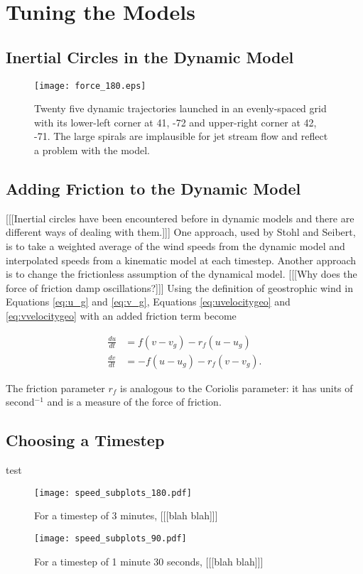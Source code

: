 \chapter{Tuning the Models}

\section{Inertial Circles in the Dynamic Model}

\begin{figure}
    \texttt{[image: force\_180.eps]}
    \centering
    \caption{Twenty five dynamic trajectories launched in an evenly-spaced grid with its lower-left corner at 41, -72 and upper-right corner at 42, -71. 
    The large spirals are implausible for jet stream flow and reflect a problem with the model.}
    \label{fig:force_180}
\end{figure}

\section{Adding Friction to the Dynamic Model}

[[[Inertial circles have been encountered before in dynamic models and there are different ways of dealing with them.]]] \cite{stohl_accuracy_1998}
One approach, used by Stohl and Seibert, is to take a weighted average of the wind speeds from the dynamic model and interpolated speeds from a kinematic model at each timestep.
Another approach is to change the frictionless assumption of the dynamical model.
[[[Why does the force of friction damp oscillations?]]]
Using the definition of geostrophic wind in Equations \ref{eq:u_g} and \ref{eq:v_g}, Equations \ref{eq:uvelocitygeo} and \ref{eq:vvelocitygeo} with an added friction term become

\begin{align}
    \frac{du}{dt} &= f (v - v_g) - r_f (u - u_g) \\
    \frac{dv}{dt} &= -f (u - u_g) - r_f (v - v_g).   
\end{align}

The friction parameter $r_f$ is analogous to the Coriolis parameter: it has units of second$^{-1}$ and is a measure of the force of friction.

\section{Choosing a Timestep} \label{sec:timestep}
test

\begin{figure}
    \texttt{[image: speed\_subplots\_180.pdf]}
    \centering
    \caption{For a timestep of 3 minutes, [[[blah blah]]]}
    \label{}
\end{figure}

\begin{figure}
    \texttt{[image: speed\_subplots\_90.pdf]}
    \centering
    \caption{For a timestep of 1 minute 30 seconds, [[[blah blah]]]}
    \label{}
\end{figure}
